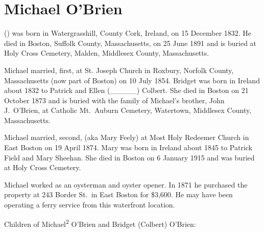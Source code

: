 \section{Michael O'Brien}

 () was born in Watergrasshill, County Cork, Ireland, on 15 December 1832.\cite{Michael2OBrienNaturalization} He died in Boston, Suffolk County, Massachusetts, on 25 June 1891\cite{Michael2OBrienDeath} and is buried at Holy Cross Cemetery, Malden, Middlesex County, Massachusetts.\cite{DianaBerberenaLetter2} 

Michael married, first,  at St. Joseph Church in Roxbury, Norfolk County, Massachusetts (now part of Boston) on 10 July 1854.\cite{BridgetColbertMarriage,BridgetColbertChurchMarriage} Bridget was born in Ireland about 1832 to Patrick and Ellen (\_\_\_\_\_) Colbert.\cite{BridgetColbertMarriage} She died in Boston on 21 October 1873\cite{BridgetColbertDeath} and is buried with the family of Michael's brother, John J.\ O'Brien, at Catholic Mt.\ Auburn Cemetery, Watertown, Middlesex County, Massachusetts.\cite{BillMcEvoy}

Michael married, second,  (aka Mary Feely) at Most Holy Redeemer Church in East Boston on 19 April 1874.\cite{MaryFieldMarriage,MaryFieldChurchMarriage} Mary was born in Ireland about 1845\cite{MaryFieldMarriage} to Patrick Field and Mary Sheehan.\cite{MaryFieldDeath} She died in Boston on 6 January 1915 and was buried at Holy Cross Cemetery.\cite{MaryFieldDeath}

Michael worked as an oysterman and oyster opener.\cite{EdwardFrancis3OBrienBirth,Michael2OBrien1886} In 1871 he purchased the property at 243 Border St.\ in East Boston for \$3,600.\cite{243BorderPurchase,243BorderMap} He may have been operating a ferry service from this waterfront location.\cite{243BorderFerry}

\begin{KidsIntro}
	Children of Michael\textsuperscript{2} O'Brien and Bridget (Colbert) O'Brien:
\end{KidsIntro}

